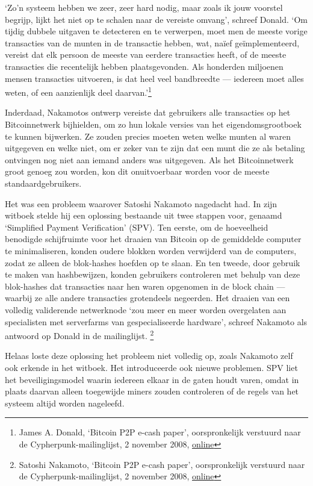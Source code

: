 \documentclass[smalldemyvopaper,11pt,twoside,onecolumn,openright,extrafontsizes,hidelinks]{memoir}
\begin{document}
`Zo'n systeem hebben we zeer, zeer hard nodig, maar zoals ik jouw
voorstel begrijp, lijkt het niet op te schalen naar de vereiste omvang',
schreef Donald. `Om tijdig dubbele uitgaven te detecteren en te
verwerpen, moet men de meeste vorige transacties van de munten in de
transactie hebben, wat, naïef geïmplementeerd, vereist dat elk persoon
de meeste van eerdere transacties heeft, of de meeste transacties die
recentelijk hebben plaatsgevonden. Als honderden miljoenen mensen
transacties uitvoeren, is dat heel veel bandbreedte --- iedereen moet
alles weten, of een aanzienlijk deel daarvan.'\footnote{James A. Donald,
  `Bitcoin P2P e-cash paper', oorspronkelijk verstuurd naar de
  Cypherpunk-mailinglijst, 2 november 2008,
  \href{https://www.metzdowd.com/pipermail/cryptography/2008-November/014814.html}{online}}

Inderdaad, Nakamotos ontwerp vereiste dat gebruikers alle transacties op
het Bitcoinnetwerk bijhielden, om zo hun lokale versies van het
eigendomsgrootboek te kunnen bijwerken. Ze zouden precies moeten weten
welke munten al waren uitgegeven en welke niet, om er zeker van te zijn
dat een munt die ze als betaling ontvingen nog niet aan iemand anders
was uitgegeven. Als het Bitcoinnetwerk groot genoeg zou worden, kon dit
onuitvoerbaar worden voor de meeste standaardgebruikers.

Het was een probleem waarover Satoshi Nakamoto nagedacht had. In zijn
witboek stelde hij een oplossing bestaande uit twee stappen voor,
genaamd `Simplified Payment Verification' (SPV). Ten eerste, om de
hoeveelheid benodigde schijfruimte voor het draaien van Bitcoin op de
gemiddelde computer te minimaliseren, konden oudere blokken worden
verwijderd van de computers, zodat ze alleen de blok-hashes hoefden op
te slaan. En ten tweede, door gebruik te maken van hashbewijzen, konden
gebruikers controleren met behulp van deze blok-hashes dat transacties
naar hen waren opgenomen in de block chain --- waarbij ze alle andere
transacties grotendeels negeerden. Het draaien van een volledig
validerende netwerknode `zou meer en meer worden overgelaten aan
specialisten met serverfarms van gespecialiseerde hardware', schreef
Nakamoto als antwoord op Donald in de mailinglijst. \footnote{Satoshi
  Nakamoto, `Bitcoin P2P e-cash paper', oorspronkelijk verstuurd naar de
  Cypherpunk-mailinglijst, 2 november 2008,
  \href{https://www.metzdowd.com/pipermail/cryptography/2008-November/014815.html}{online}}

Helaas loste deze oplossing het probleem niet volledig op, zoals
Nakamoto zelf ook erkende in het witboek. Het introduceerde ook nieuwe
problemen. SPV liet het beveiligingsmodel waarin iedereen elkaar in de
gaten houdt varen, omdat in plaats daarvan alleen toegewijde miners
zouden controleren of de regels van het systeem altijd worden nageleefd.
\end{document}
